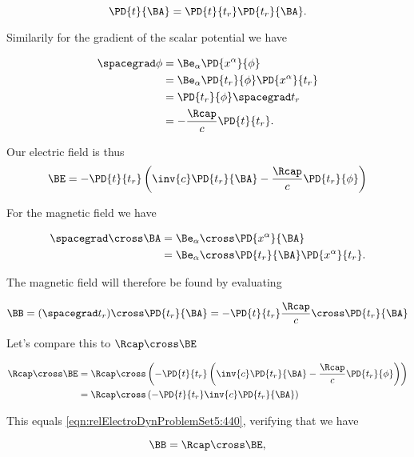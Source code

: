 \begin{equation}\label{eqn:relElectroDynProblemSet5:400}
\PD{t}{\BA} = \PD{t}{t_r} \PD{t_r}{\BA}.
\end{equation}

Similarily for the gradient of the scalar potential we have

\begin{align*}
\spacegrad \phi 
&=
\Be_\alpha \PD{x^\alpha}{\phi} \\
&=
\Be_\alpha \PD{t_r}{\phi} \PD{x^\alpha}{t_r} \\
&=
\PD{t_r}{\phi} \spacegrad t_r \\
&=
- \frac{\Rcap}{c} \PD{t}{t_r}.
\end{align*}

Our electric field is thus
\begin{equation}\label{eqn:relElectroDynProblemSet5:420}
\BE = - \PD{t}{t_r} \left( \inv{c} \PD{t_r}{\BA} - \frac{\Rcap}{c} \PD{t_r}{\phi} \right)
\end{equation}

For the magnetic field we have

\begin{align*}
\spacegrad \cross \BA
&=
\Be_\alpha \cross \PD{x^\alpha}{\BA} \\
&=
\Be_\alpha \cross 
\PD{t_r}{\BA} \PD{x^\alpha}{t_r}.
\end{align*}

The magnetic field will therefore be found by evaluating 

\begin{equation}\label{eqn:relElectroDynProblemSet5:440}
\BB = (\spacegrad t_r) \cross \PD{t_r}{\BA} = - \PD{t}{t_r} \frac{\Rcap}{c} \cross \PD{t_r}{\BA} 
\end{equation}

Let's compare this to $\Rcap \cross \BE$ 

\begin{align*}
\Rcap \cross \BE 
&= \Rcap \cross \left( 
- \PD{t}{t_r} \left( \inv{c} \PD{t_r}{\BA} - \frac{\Rcap}{c} \PD{t_r}{\phi} \right) \right) \\
&= \Rcap \cross \left( - \PD{t}{t_r} \inv{c} \PD{t_r}{\BA} \right)
\end{align*}

This equals \ref{eqn:relElectroDynProblemSet5:440}, verifying that we have

\begin{equation}\label{eqn:relElectroDynProblemSet5:450}
\BB = \Rcap \cross \BE,
\end{equation}


